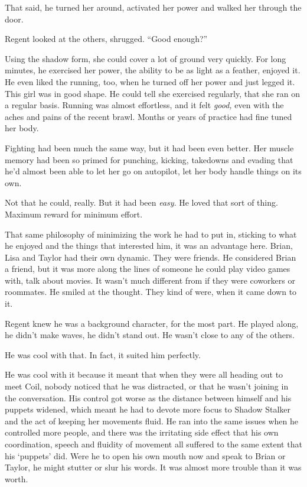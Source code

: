 That said, he turned her around, activated her power and walked her through the door.



Regent looked at the others, shrugged.  ``Good enough?''



Using the shadow form, she could cover a lot of ground very quickly.  For long minutes, he exercised her power, the ability to be as light as a feather, enjoyed it.  He even liked the running, too, when he turned off her power and just legged it.  This girl was in good shape.  He could tell she exercised regularly, that she ran on a regular basis.  Running was almost effortless, and it felt \emph{good,} even with the aches and pains of the recent brawl. Months or years of practice had fine tuned her body.



Fighting had been much the same way, but it had been even better.  Her muscle memory had been so primed for punching, kicking, takedowns and evading that he'd almost been able to let her go on autopilot, let her body handle things on its own.



Not that he could, really.  But it had been \emph{easy}.  He loved that sort of thing.  Maximum reward for minimum effort.



That same philosophy of minimizing the work he had to put in, sticking to what he enjoyed and the things that interested him, it was an advantage here.  Brian, Lisa and Taylor had their own dynamic.  They were friends.  He considered Brian a friend, but it was more along the lines of someone he could play video games with, talk about movies.  It wasn't much different from if they were coworkers or roommates.  He smiled at the thought.  They kind of were, when it came down to it.



Regent knew he was a background character, for the most part.  He played along, he didn't make waves, he didn't stand out.  He wasn't close to any of the others.



He was cool with that.  In fact, it suited him perfectly.



He was cool with it because it meant that when they were all heading out to meet Coil, nobody noticed that he was distracted, or that he wasn't joining in the conversation.  His control got worse as the distance between himself and his puppets widened, which meant he had to devote more focus to Shadow Stalker and the act of keeping her movements fluid.  He ran into the same issues when he controlled more people, and there was the irritating side effect that his own coordination, speech and fluidity of movement all suffered to the same extent that his `puppets' did.  Were he to open his own mouth now and speak to Brian or Taylor, he might stutter or slur his words.  It was almost more trouble than it was worth.



